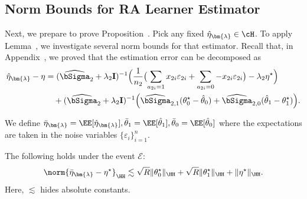 \documentclass[12pt,a4paper,pdftex,onepage]{article}
\newcommand{\Sighat}{\widehat{{\bSigma}}}
\newcommand{\event}{\mathscr{E}}
\begin{document}
\subsection{Norm Bounds for RA Learner Estimator}\label{subsection; norm bounds RA learner estimator}
Next, we prepare to prove Proposition~.
Pick any fixed $\hat{\eta}_{\bm{\lambda}} \in \cH$. 
To apply Lemma~, we investigate several norm bounds for that estimator.
Recall that, in Appendix~, we proved that the estimation error can be decomposed as
\begin{align*}
{\hat{\eta}_{\bm{\lambda}} -\eta } &= (\Sighat_2 + \lambda_2 \mathbf{I})^{-1} \Bigl( \frac{1}{n_2} \bigl(\sum_{a_{2i}=1}x_{2i} \varepsilon_{2i}+\sum_{a_{2i}=0} -x_{2i}\varepsilon_{2i}\bigr) -\lambda_2 \eta^\star\Bigr)\\
&\quad + (\Sighat_2 + \lambda_2 \mathbf{I})^{-1} \Bigl( \Sighat_{2,1}({\theta}^\star_0-\hat{\theta}_0)
+ \Sighat_{2,0} (\hat{\theta}_1-{\theta}^\star_1)  \Bigr).
\end{align*}

We define \(\bar{\eta}_{\bm{\lambda}} = \EE[\hat{\eta}_{\bm{\lambda}}],\bar{\theta}_1 = \EE[\hat{\theta}_1],\bar{\theta}_0 = \EE[\hat{\theta}_0] \) where the expectations are taken in the noise variables \(\{\varepsilon_i\}_{i=1}^n\).

\begin{lemma}\label{lemma; bias H bound}
The following holds under the event $\event$:
\begin{align*}
\norm{\bar{\eta}_{\bm{\lambda}} - \eta^\star}_{\HH} \lesssim \sqrt{R} \| \theta_0^\star\|_{\HH}+  \sqrt{R} \| \theta_1^\star\|_{\HH} + \|\eta^\star \|_{\HH}.
\end{align*}
Here, \(\lesssim\) hides absolute constants.
\end{lemma}
\end{document}
